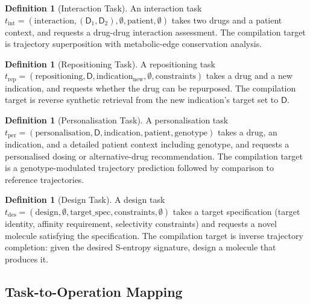 \documentclass[11pt,twocolumn,a4paper]{article}
\theoremstyle{definition}
\newtheorem{definition}[theorem]{Definition}
\theoremstyle{remark}
\begin{document}
\begin{definition}[Interaction Task]
\label{def:interaction_task}
An interaction task $t_{\mathrm{int}} = (\mathrm{interaction}, (\mathsf{D}_1, \mathsf{D}_2), \emptyset, \mathrm{patient}, \emptyset)$ takes two drugs and a patient context, and requests a drug-drug interaction assessment. The compilation target is trajectory superposition with metabolic-edge conservation analysis.
\end{definition}

\begin{definition}[Repositioning Task]
\label{def:repositioning_task}
A repositioning task $t_{\mathrm{rep}} = (\mathrm{repositioning}, \mathsf{D}, \mathrm{indication}_{\mathrm{new}}, \emptyset, \mathrm{constraints})$ takes a drug and a new indication, and requests whether the drug can be repurposed. The compilation target is reverse synthetic retrieval from the new indication's target set to $\mathsf{D}$.
\end{definition}

\begin{definition}[Personalisation Task]
\label{def:personalisation_task}
A personalisation task $t_{\mathrm{per}} = (\mathrm{personalisation}, \mathsf{D}, \mathrm{indication}, \mathrm{patient}, \mathrm{genotype})$ takes a drug, an indication, and a detailed patient context including genotype, and requests a personalised dosing or alternative-drug recommendation. The compilation target is a genotype-modulated trajectory prediction followed by comparison to reference trajectories.
\end{definition}

\begin{definition}[Design Task]
\label{def:design_task}
A design task $t_{\mathrm{des}} = (\mathrm{design}, \emptyset, \mathrm{target\_spec}, \mathrm{constraints}, \emptyset)$ takes a target specification (target identity, affinity requirement, selectivity constraints) and requests a novel molecule satisfying the specification. The compilation target is inverse trajectory completion: given the desired S-entropy signature, design a molecule that produces it.
\end{definition}

\subsection{Task-to-Operation Mapping}
\end{document}
